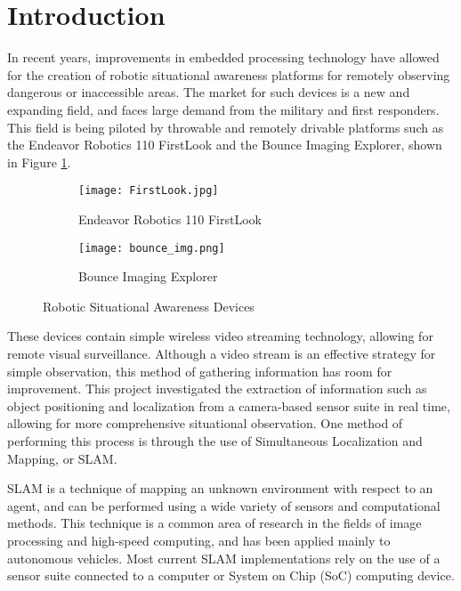 \section{Introduction}
In recent years, improvements in embedded processing technology have allowed for the creation of robotic situational awareness platforms for remotely observing dangerous or inaccessible areas. The market for such devices is a new and expanding field, and faces large demand from the military and first responders. This field is being piloted by throwable and remotely drivable platforms such as the Endeavor Robotics 110 FirstLook and the Bounce Imaging Explorer, shown in Figure \ref{robocop}. 

\par
\begin{figure}[H]
        \begin{subfigure}[h]{0.5\textwidth}
             \centerline{\texttt{[image: FirstLook.jpg]}}
            \caption{Endeavor Robotics 110 FirstLook \cite{endeavor}}
        \end{subfigure}
        \begin{subfigure}[h]{0.5\textwidth}
            \centerline{\texttt{[image: bounce\_img.png]}}
            \caption{Bounce Imaging Explorer \cite{bounceImaging}}
        \end{subfigure}
\caption{Robotic Situational Awareness Devices}
\label{robocop}
\end{figure}
\par
These devices contain simple wireless video streaming technology, allowing for remote visual surveillance. Although a video stream is an effective strategy for simple observation, this method of gathering information has room for improvement. This project investigated the extraction of information such as object positioning and localization from a camera-based sensor suite in real time, allowing for more comprehensive situational observation. One method of performing this process is through the use of Simultaneous Localization and Mapping, or SLAM. 
\par
SLAM is a technique of mapping an unknown environment with respect to an agent, and can be performed using a wide variety of sensors and computational methods. This technique is a common area of research in the fields of image processing and high-speed computing, and has been applied mainly to autonomous vehicles. Most current SLAM implementations rely on the use of a sensor suite connected to a computer or System on Chip (SoC) computing device. 
